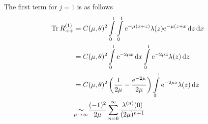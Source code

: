 The first term for $j=1$ is as follows
\begin{align*}
    \Tr R^{(1)}_{++} &= C(\mu,\theta)^2
        \Integ[1]{0}{x}{
            \Integ[1]{0}{z}{\Eto{-\mu(x+z)}
            \lambda(z)\Eto{-\mu(z+x}}
            }
        \\
        &= C(\mu,\theta)^2
            \Integ[1]{0}{x}{
                \Eto{-2\mu x}
            }
            \Integ[1]{0}{z}{\Eto{-2\mu z}\lambda(z)}
        \\
        &= C(\mu, \theta)^2 \left(
            \frac1{2\mu} - \frac{\Eto{-2\mu}}{2\mu}
           \right)
           \Integ[1]{0}{z}{\Eto{-2\mu z}\lambda(z)}
        \\
        &\SimAs{\mu\to\infty}
            \frac{(-1)^2}{2\mu}
            \sum_{n=0}^{\infty}\frac{\lambda^{(n)}(0)}{(2\mu)^{n+1}}
\end{align*}
